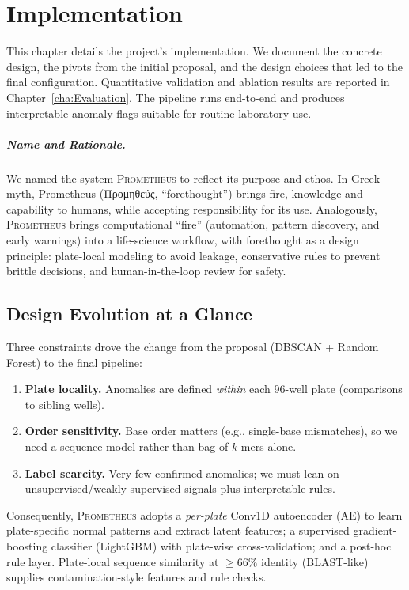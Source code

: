 
%

\chapter{Implementation}
\label{cha:Implementation}

This chapter details the project's implementation. We document the concrete design, the pivots from the initial proposal, and the design choices that led to the final configuration. Quantitative validation and ablation results are reported in Chapter~\ref{cha:Evaluation}. The pipeline runs end-to-end and produces interpretable anomaly flags suitable for routine laboratory use.

\paragraph{Name and Rationale.}
We named the system \textsc{Prometheus} to reflect its purpose and ethos. In Greek myth, Prometheus (Προμηθεύς, “forethought”) brings fire, knowledge and capability to humans, while accepting responsibility for its use. Analogously, \textsc{Prometheus} brings computational “fire” (automation, pattern discovery, and early warnings) into a life-science workflow, with forethought as a design principle: plate-local modeling to avoid leakage, conservative rules to prevent brittle decisions, and human-in-the-loop review for safety. 

\section{Design Evolution at a Glance}
\label{sec:impl_evolution}
Three constraints drove the change from the proposal (DBSCAN + Random Forest) to the final pipeline:
\begin{enumerate}
  \item \textbf{Plate locality.} Anomalies are defined \emph{within} each 96-well plate (comparisons to sibling wells).
  \item \textbf{Order sensitivity.} Base order matters (e.g., single-base mismatches), so we need a sequence model rather than bag-of-$k$-mers alone.
  \item \textbf{Label scarcity.} Very few confirmed anomalies; we must lean on unsupervised/weakly-supervised signals plus interpretable rules.
\end{enumerate}
Consequently, \textsc{Prometheus} adopts a \emph{per-plate} Conv1D autoencoder (AE) to learn plate-specific normal patterns and extract latent features; a supervised gradient-boosting classifier (LightGBM) with plate-wise cross-validation; and a post-hoc rule layer. Plate-local sequence similarity at $\geq 66\%$ identity (BLAST-like) supplies contamination-style features and rule checks.


